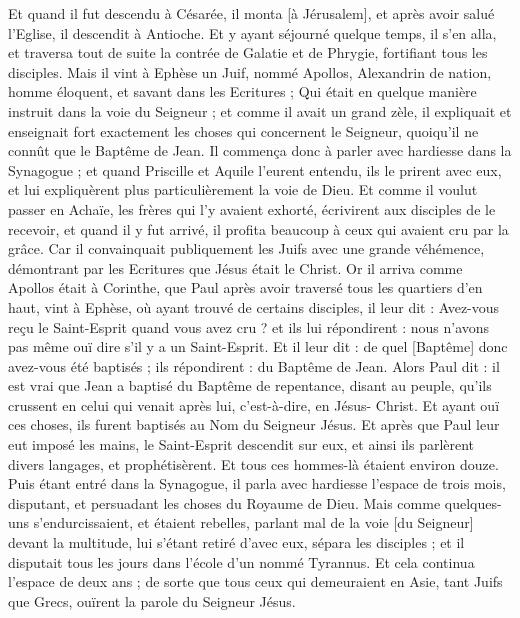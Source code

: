 \begin{multicols}{2}
Et quand il fut descendu à Césarée, il monta [à Jérusalem], et après avoir salué l'Eglise, il descendit à Antioche.
Et y ayant séjourné quelque temps, il s'en alla, et traversa tout de suite la contrée de Galatie et de Phrygie, fortifiant tous les disciples.
Mais il vint à Ephèse un Juif, nommé Apollos, Alexandrin de nation, homme éloquent, et savant dans les Ecritures ;
Qui était en quelque manière instruit dans la voie du Seigneur ; et comme il avait un grand zèle, il expliquait et enseignait fort exactement les choses qui concernent le Seigneur, quoiqu'il ne connût que le Baptême de Jean.
Il commença donc à parler avec hardiesse dans la Synagogue ; et quand Priscille et Aquile l'eurent entendu, ils le prirent avec eux, et lui expliquèrent plus particulièrement la voie de Dieu.
Et comme il voulut passer en Achaïe, les frères qui l'y avaient exhorté, écrivirent aux disciples de le recevoir, et quand il y fut arrivé, il profita beaucoup à ceux qui avaient cru par la grâce.
Car il convainquait publiquement les Juifs avec une grande véhémence, démontrant par les Ecritures que Jésus était le Christ.
\VerseOne{}Or il arriva comme Apollos était à Corinthe, que Paul après avoir traversé tous les quartiers d'en haut, vint à Ephèse, où ayant trouvé de certains disciples, il leur dit :
Avez-vous reçu le Saint-Esprit quand vous avez cru ? et ils lui répondirent : nous n'avons pas même ouï dire s'il y a un Saint-Esprit.
Et il leur dit : de quel [Baptême] donc avez-vous été baptisés ; ils répondirent : du Baptême de Jean.
Alors Paul dit : il est vrai que Jean a baptisé du Baptême de repentance, disant au peuple, qu'ils crussent en celui qui venait après lui, c'est-à-dire, en Jésus- Christ.
Et ayant ouï ces choses, ils furent baptisés au Nom du Seigneur Jésus.
Et après que Paul leur eut imposé les mains, le Saint-Esprit descendit sur eux, et ainsi ils parlèrent divers langages, et prophétisèrent.
Et tous ces hommes-là étaient environ douze.
Puis étant entré dans la Synagogue, il parla avec hardiesse l'espace de trois mois, disputant, et persuadant les choses du Royaume de Dieu.
Mais comme quelques-uns s'endurcissaient, et étaient rebelles, parlant mal de la voie [du Seigneur] devant la multitude, lui s'étant retiré d'avec eux, sépara les disciples ; et il disputait tous les jours dans l'école d'un nommé Tyrannus.
Et cela continua l'espace de deux ans ; de sorte que tous ceux qui demeuraient en Asie, tant Juifs que Grecs, ouïrent la parole du Seigneur Jésus.

\end{multicols}
